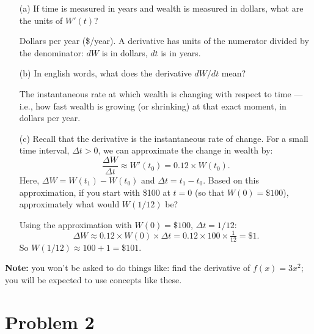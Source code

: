 \documentclass[11pt]{article}
\begin{document}
\begin{enumerate}
  \item[(a)] If time is measured in years and wealth is measured in
  dollars, what are the units of $W'(t)$?
  \begin{solution}
  Dollars per year (\$/year). A derivative has units of the numerator
  divided by the denominator: $dW$ is in dollars, $dt$ is in years.
  \end{solution}

  \item[(b)] In english words, what does the derivative $dW/dt$ mean?
  \begin{solution}
  The instantaneous rate at which wealth is changing with respect to
  time --- i.e., how fast wealth is growing (or shrinking) at that exact
  moment, in dollars per year.
  \end{solution}

  \item[(c)] Recall that the derivative is the instantaneous rate of
  change. For a small time interval, $\Delta t > 0$, we can approximate
  the change in wealth by:
  \begin{equation*}
    \frac{\Delta W}{\Delta t} \approx W'(t_0) = 0.12 \times W(t_0).
  \end{equation*}
  Here, $\Delta W = W(t_1) - W(t_0)$ and $\Delta t = t_1 - t_0$. Based on
  this approximation, if you start with \$100 at $t = 0$ (so that $W(0) =
  \$100$), approximately what would $W(1/12)$ be?
  \begin{solution}
  Using the approximation with $W(0) = \$100$, $\Delta t = 1/12$:
  \begin{equation*}
    \Delta W \approx 0.12 \times W(0) \times \Delta t
                   = 0.12 \times 100 \times \tfrac{1}{12}
                   = \$1.
  \end{equation*}
  So $W(1/12) \approx 100 + 1 = \boxed{\$101}$.
  \end{solution}
\end{enumerate}

\noindent\textbf{Note:} you won't be asked to do things like: find the
derivative of $f(x) = 3x^2$; you will be expected to use concepts like
these.

\section*{Problem 2}
\end{document}
